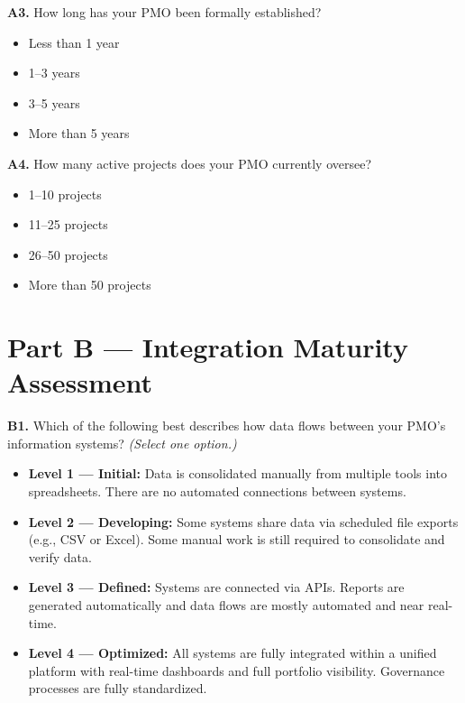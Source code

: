 \bigskip
\noindent\textbf{A3.} How long has your PMO been formally established?

\begin{itemize}
  \item[$\square$] Less than 1 year
  \item[$\square$] 1--3 years
  \item[$\square$] 3--5 years
  \item[$\square$] More than 5 years
\end{itemize}

\bigskip
\noindent\textbf{A4.} How many active projects does your PMO currently oversee?

\begin{itemize}
  \item[$\square$] 1--10 projects
  \item[$\square$] 11--25 projects
  \item[$\square$] 26--50 projects
  \item[$\square$] More than 50 projects
\end{itemize}

\bigskip

\section*{Part B --- Integration Maturity Assessment}

\noindent\textbf{B1.} Which of the following best describes how data flows
between your PMO's information systems? \textit{(Select one option.)}

\begin{itemize}
  \item[$\square$] \textbf{Level 1 --- Initial:} Data is consolidated manually
  from multiple tools into spreadsheets. There are no automated connections
  between systems.
  \item[$\square$] \textbf{Level 2 --- Developing:} Some systems share data via
  scheduled file exports (e.g., CSV or Excel). Some manual work is still
  required to consolidate and verify data.
  \item[$\square$] \textbf{Level 3 --- Defined:} Systems are connected via APIs.
  Reports are generated automatically and data flows are mostly automated and
  near real-time.
  \item[$\square$] \textbf{Level 4 --- Optimized:} All systems are fully
  integrated within a unified platform with real-time dashboards and full
  portfolio visibility. Governance processes are fully standardized.
\end{itemize}

